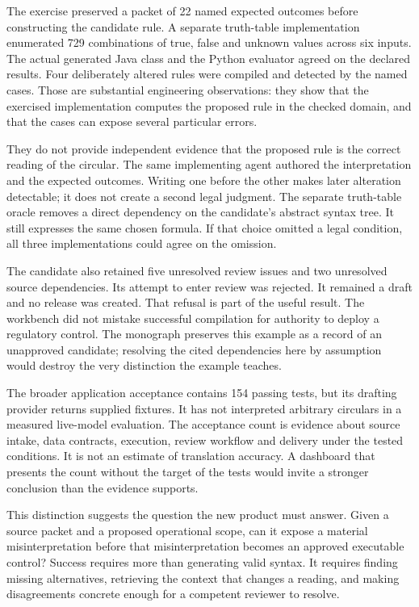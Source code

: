 The exercise preserved a packet of 22 named expected outcomes before constructing
the candidate rule. A separate truth-table implementation enumerated 729
combinations of true, false and unknown values across six inputs. The actual
generated Java class and the Python evaluator agreed on the declared results.
Four deliberately altered rules were compiled and detected by the named cases.
Those are substantial engineering observations: they show that the exercised
implementation computes the proposed rule in the checked domain, and that the
cases can expose several particular errors.

They do not provide independent evidence that the proposed rule is the correct
reading of the circular. The same implementing agent authored the interpretation
and the expected outcomes. Writing one before the other makes later alteration
detectable; it does not create a second legal judgment. The separate truth-table
oracle removes a direct dependency on the candidate's abstract syntax tree. It
still expresses the same chosen formula. If that choice omitted a legal
condition, all three implementations could agree on the omission.

The candidate also retained five unresolved review issues and two unresolved
source dependencies. Its attempt to enter review was rejected. It remained a
draft and no release was created. That refusal is part of the useful result.
The workbench did not mistake successful compilation for authority to deploy a
regulatory control. The monograph preserves this example as a record of an
unapproved candidate; resolving the cited dependencies here by assumption would
destroy the very distinction the example teaches.

The broader application acceptance contains 154 passing tests, but its drafting
provider returns supplied fixtures. It has not interpreted arbitrary circulars
in a measured live-model evaluation. The acceptance count is evidence about
source intake, data contracts, execution, review workflow and delivery under the
tested conditions. It is not an estimate of translation accuracy. A dashboard
that presents the count without the target of the tests would invite a stronger
conclusion than the evidence supports.

This distinction suggests the question the new product must answer. Given a
source packet and a proposed operational scope, can it expose a material
misinterpretation before that misinterpretation becomes an approved executable
control? Success requires more than generating valid syntax. It requires finding
missing alternatives, retrieving the context that changes a reading, and making
disagreements concrete enough for a competent reviewer to resolve.

